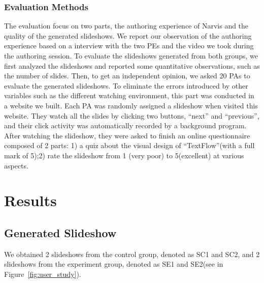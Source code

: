 \subsubsection{Evaluation Methods}
The evaluation focus on two parts, the authoring experience of Narvis and the quality of the generated slideshows. We report our observation of the authoring experience based on a interview with the two PEs and the video we took during the authoring session. 
To evaluate the slideshows generated from both groups, we first analyzed the slideshows and reported some quantitative observations, such as the number of slides.
Then, to get an independent opinion, we asked 20 PAs to evaluate the generated slideshows. To eliminate the errors introduced by other variables such as the different watching environment, this part was conducted in a website we built. Each PA was randomly assigned a slideshow when visited this website. They watch all the slides by clicking two buttons, ``next'' and ``previous'', and their click activity was automatically recorded by a background program.  After watching the slideshow, they were asked to finish an online questionnaire composed of 2 parts: 1) a quiz about the visual design of ``TextFlow''(with a full mark of 5);2) rate the slideshow  from 1 (very poor) to 5(excellent) at various aspects. 

\section{Results}

\subsection{Generated Slideshow}
We obtained 2 slideshows from the control group, denoted as SC1 and SC2, and 2 slideshows from the experiment group, denoted as SE1 and SE2(see in Figure~\ref{fig:user_study}). 


